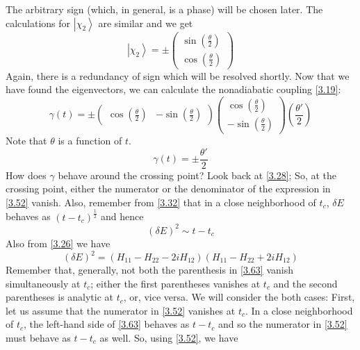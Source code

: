 \documentclass[12pt,a4paper]{article}
\begin{document}
	The arbitrary sign (which, in general, is a phase) will be chosen later. The calculations for $\left| \chi_{2} \right\rangle$ are similar and we get
	\begin{equation}
		\left| \chi_{2} \right\rangle = \pm
		\begin{pmatrix}
			\sin(\frac{\theta}{2}) \\[5pt]
			\cos(\frac{\theta}{2})
		\end{pmatrix}
	\end{equation}
	Again, there is a redundancy of sign which will be resolved shortly.
	Now that we have found the eigenvectors, we can calculate the nonadiabatic coupling \eqref{3.19}:
	\begin{equation}
		\gamma(t) = \pm 
		\begin{pmatrix}
			\cos(\frac{\theta}{2}) & -\sin(\frac{\theta}{2})
		\end{pmatrix}
		\begin{pmatrix}
			\cos(\frac{\theta}{2}) \\[5pt]
			-\sin(\frac{\theta}{2})
		\end{pmatrix}
		\left( \dfrac{\theta'}{2} \right)
	\end{equation}
	Note that $\theta$ is a function of $t$.
	\begin{equation}
		\gamma(t) = \pm \dfrac{\theta'}{2}
	\end{equation}
	How does $\gamma$ behave around the crossing point? Look back at \eqref{3.28}; So, at the crossing point, either the numerator or the denominator of the expression in \eqref{3.52} vanish. Also, remember from \eqref{3.32} that in a close neighborhood of $t_{c}$, $\delta E$ behaves as $\left( t - t_{c} \right)^{\frac{1}{2}}$ and hence
	\begin{equation}
		\left( \delta E \right)^{2} \sim t - t_{c} \label{3.62}
	\end{equation}
	Also from \eqref{3.26} we have
	\begin{equation}
		\left( \delta E \right)^{2} = \left( H_{11} - H_{22} - 2i H_{12} \right) \left( H_{11} - H_{22} + 2i H_{12} \right) \label{3.63}
	\end{equation}
	Remember that, generally, not both the parenthesis in \eqref{3.63} vanish simultaneously at $t_{c}$; either the first parentheses vanishes at $t_{c}$ and the second parentheses is analytic at $t_{c}$, or, vice versa. We will consider the both cases: First, let us assume that the numerator in \eqref{3.52} vanishes at $t_{c}$. In a close neighborhood of $t_{c}$, the left-hand side of \eqref{3.63} behaves as $t-t_{c}$ and so the numerator in \eqref{3.52} must behave as $t-t_{c}$ as well. So, using \eqref{3.52}, we have
\end{document}
